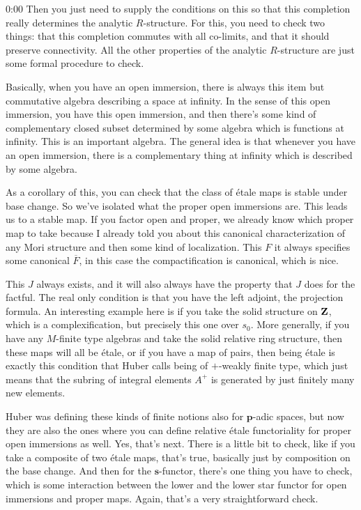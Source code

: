 \begin{unfinished}{0:00}
Then you just need to supply the conditions on this so that this completion really determines the analytic $R$-structure. For this, you need to check two things: that this completion commutes with all co-limits, and that it should preserve connectivity. All the other properties of the analytic $R$-structure are just some formal procedure to check.

Basically, when you have an open immersion, there is always this item but commutative algebra describing a space at infinity. In the sense of this open immersion, you have this open immersion, and then there's some kind of complementary closed subset determined by some algebra which is functions at infinity. This is an important algebra. The general idea is that whenever you have an open immersion, there is a complementary thing at infinity which is described by some algebra.

As a corollary of this, you can check that the class of étale maps is stable under base change. So we've isolated what the proper open immersions are. This leads us to a stable map. If you factor open and proper, we already know which proper map to take because I already told you about this canonical characterization of any Mori structure and then some kind of localization. This $F$ it always specifies some canonical $\overline{F}$, in this case the compactification is canonical, which is nice.

This $J$ always exists, and it will also always have the property that $J$ does for the factful. The real only condition is that you have the left adjoint, the projection formula. An interesting example here is if you take the solid structure on $\mathbf Z$, which is a complexification, but precisely this one over $s_0$. More generally, if you have any $M$-finite type algebras and take the solid relative ring structure, then these maps will all be étale, or if you have a map of pairs, then being étale is exactly this condition that Huber calls being of $+$-weakly finite type, which just means that the subring of integral elements $A^+$ is generated by just finitely many new elements.

Huber was defining these kinds of finite notions also for $\mathbf{p}$-adic spaces, but now they are also the ones where you can define relative étale functoriality for proper open immersions as well. Yes, that's next. There is a little bit to check, like if you take a composite of two étale maps, that's true, basically just by composition on the base change. And then for the $\mathbf{s}$-functor, there's one thing you have to check, which is some interaction between the lower and the lower star functor for open immersions and proper maps. Again, that's a very straightforward check.


\end{unfinished}
